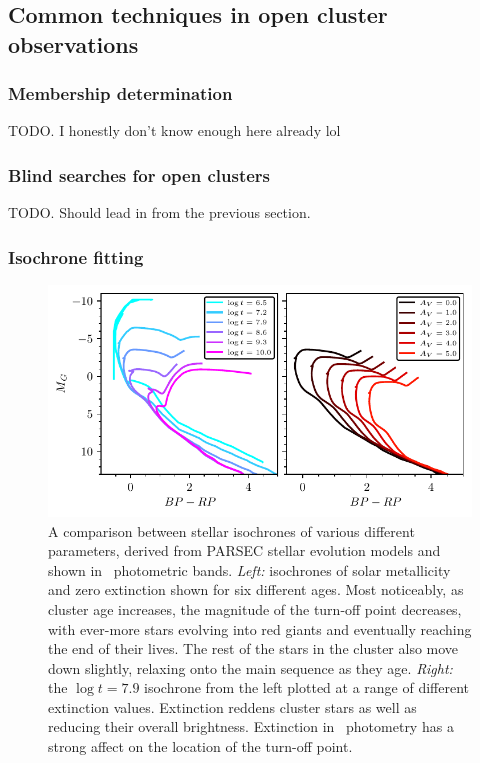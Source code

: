 \subsection{Common techniques in open cluster observations}
\label{sec:intro:history:techniques}
\subsubsection{Membership determination}

TODO. I honestly don't know enough here already lol

\subsubsection{Blind searches for open clusters}

TODO. Should lead in from the previous section.

\subsubsection{Isochrone fitting}

\begin{figure}[tb]
	\includegraphics[width=\textwidth]{fig/c1/isochrones.pdf}
	\caption[A comparison between stellar isochrones of various different parameters.]{A comparison between stellar isochrones of various different parameters, derived from PARSEC stellar evolution models \citep{bressan_parsec_2012} and shown in \gaia\ photometric bands. \emph{Left:} isochrones of solar metallicity and zero extinction shown for six different ages. Most noticeably, as cluster age increases, the magnitude of the turn-off point decreases, with ever-more stars evolving into red giants and eventually reaching the end of their lives. The rest of the stars in the cluster also move down slightly, relaxing onto the main sequence as they age. \emph{Right:} the $\log t = 7.9$ isochrone from the left plotted at a range of different extinction values. Extinction reddens cluster stars as well as reducing their overall brightness. Extinction in \gaia\ photometry has a strong affect on the location of the turn-off point.}
	\label{fig:intro:history:isochrones}
\end{figure}

